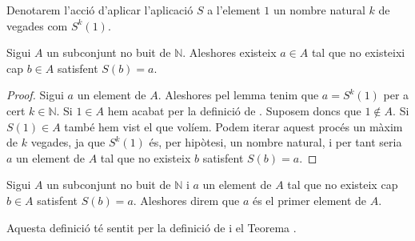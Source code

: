 \documentclass[../Apunts.tex]{subfiles}
\begin{document}
	\begin{notation}
		Denotarem l'acció d'aplicar l'aplicació \(S\) a l'element \(1\) un nombre natural \(k\) de vegades com \(S^{k}(1)\).
	\end{notation}
	\begin{theorem}
		\label{thm:primer element}
		Sigui \(A\) un subconjunt no buit de \(\mathbb{N}\). Aleshores existeix \(a\in A\) tal que no existeixi cap \(b\in A\) satisfent \(S(b)=a\).
		\begin{proof}
			Sigui \(a\) un element de \(A\). Aleshores pel lemma  tenim que \(a=S^{k}(1)\) per a cert \(k\in\mathbb{N}\). Si \(1\in A\) hem acabat per la definició de . Suposem doncs que \(1\notin A\). Si \(S(1)\in A\) també hem vist el que volíem. Podem iterar aquest procés un màxim de \(k\) vegades, ja que \(S^{k}(1)\) és, per hipòtesi, un nombre natural, i per tant seria \(a\) un element de \(A\) tal que no existeix \(b\) satisfent \(S(b)=a\).
		\end{proof}
	\end{theorem}
	\begin{definition}
		\label{def:primer element}
		Sigui \(A\) un subconjunt no buit de \(\mathbb{N}\) i \(a\) un element de \(A\) tal que no existeix cap \(b\in A\) satisfent \(S(b)=a\). Aleshores direm que \(a\) és el primer element de \(A\).
		
		Aquesta definició té sentit per la definició de  i el Teorema .
	\end{definition}
\end{document}
